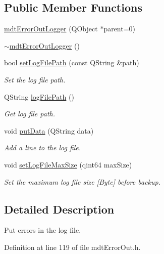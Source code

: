\subsection*{Public Member Functions}
\begin{DoxyCompactItemize}
\item 
\hyperlink{classmdt_error_out_logger_a323c048fd3a5107e8b28a7c7a9c4cf9d}{mdt\-Error\-Out\-Logger} (Q\-Object $\ast$parent=0)
\item 
\hyperlink{classmdt_error_out_logger_a3e2b53cbb5b057da952f71bfc6cdd785}{$\sim$mdt\-Error\-Out\-Logger} ()
\item 
bool \hyperlink{classmdt_error_out_logger_a6e68b905a6c1f9452523b8a0e336ce1e}{set\-Log\-File\-Path} (const Q\-String \&path)
\begin{DoxyCompactList}\small\item\em Set the log file path. \end{DoxyCompactList}\item 
Q\-String \hyperlink{classmdt_error_out_logger_ac0d0bcca2d181c722f2ee5d024de5d57}{log\-File\-Path} ()
\begin{DoxyCompactList}\small\item\em Get log file path. \end{DoxyCompactList}\item 
void \hyperlink{classmdt_error_out_logger_a4ba2f6f02c9c22171c4d04a8065aafd8}{put\-Data} (Q\-String data)
\begin{DoxyCompactList}\small\item\em Add a line to the log file. \end{DoxyCompactList}\item 
void \hyperlink{classmdt_error_out_logger_a2f7158e61fd961e35f589bb2d1f51e03}{set\-Log\-File\-Max\-Size} (qint64 max\-Size)
\begin{DoxyCompactList}\small\item\em Set the maximum log file size \mbox{[}Byte\mbox{]} before backup. \end{DoxyCompactList}\end{DoxyCompactItemize}


\subsection{Detailed Description}
Put errors in the log file. 

Definition at line 119 of file mdt\-Error\-Out.\-h.



